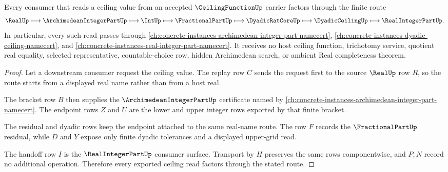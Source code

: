\begin{theorem}
\label{thm:ceiling-function-real-integer-part-handoff}
Every consumer that reads a ceiling value from an accepted $\CeilingFunctionUp$ carrier factors through the finite route
$$
\RealUp \longmapsto \ArchimedeanIntegerPartUp \longmapsto \IntUp \longmapsto \FractionalPartUp \longmapsto \DyadicRatCoreUp \longmapsto \DyadicCeilingUp \longmapsto \RealIntegerPartUp .
$$
In particular, every such read passes through \autoref{ch:concrete-instances-archimedean-integer-part-namecert}, \autoref{ch:concrete-instances-dyadic-ceiling-namecert}, and \autoref{ch:concrete-instances-real-integer-part-namecert}. It receives no host ceiling function, trichotomy service, quotient real equality, selected representative, countable-choice row, hidden Archimedean search, or ambient Real completeness theorem.
\end{theorem}
\begin{proof}
Let a downstream consumer request the ceiling value. The replay row $C$ sends the request first to the source $\RealUp$ row $R$, so the route starts from a displayed real name rather than from a host real.

The bracket row $B$ then supplies the $\ArchimedeanIntegerPartUp$ certificate named by \autoref{ch:concrete-instances-archimedean-integer-part-namecert}. The endpoint rows $Z$ and $U$ are the lower and upper integer rows exported by that finite bracket.

The residual and dyadic rows keep the endpoint attached to the same real-name route. The row $F$ records the $\FractionalPartUp$ residual, while $D$ and $Y$ expose only finite dyadic tolerances and a displayed upper-grid read.

The handoff row $I$ is the $\RealIntegerPartUp$ consumer surface. Transport by $H$ preserves the same rows componentwise, and $P,N$ record no additional operation. Therefore every exported ceiling read factors through the stated route.
\end{proof}


